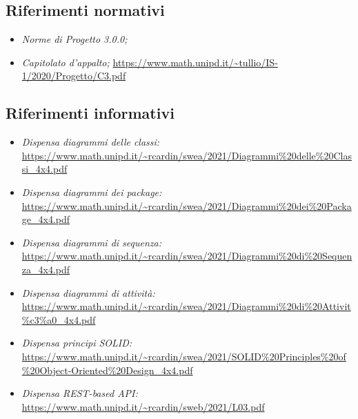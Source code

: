 \subsection{Riferimenti normativi}\label{IntroduzioneRiferimentiRiferimentiNormativi}
\begin{itemize}
	\item \textit{Norme di Progetto 3.0.0;}
	\item \textit{Capitolato d'appalto;}
	\url{https://www.math.unipd.it/~tullio/IS-1/2020/Progetto/C3.pdf}
\end{itemize}
\subsection{Riferimenti informativi}\label{IntroduzioneRiferimentiRiferimentiInformativi}
\begin{itemize}
	\item \textit{Dispensa diagrammi delle classi:}\\
	\url{https://www.math.unipd.it/~rcardin/swea/2021/Diagrammi\%20delle\%20Classi_4x4.pdf}
	\item \textit{Dispensa diagrammi dei package:}\\
	\url{https://www.math.unipd.it/~rcardin/swea/2021/Diagrammi\%20dei\%20Package_4x4.pdf}
	\item \textit{Dispensa diagrammi di sequenza:}\\
	\url{https://www.math.unipd.it/~rcardin/swea/2021/Diagrammi\%20di\%20Sequenza_4x4.pdf}
	\item \textit{Dispensa diagrammi di attività:}\\
	\url{https://www.math.unipd.it/~rcardin/swea/2021/Diagrammi\%20di\%20Attivit\%c3\%a0_4x4.pdf}
	\item \textit{Dispensa principi SOLID:}\\
	\url{https://www.math.unipd.it/~rcardin/swea/2021/SOLID\%20Principles\%20of\%20Object-Oriented\%20Design_4x4.pdf}
	\item \textit{Dispensa REST-based API:}\\
	\url{https://www.math.unipd.it/~rcardin/sweb/2021/L03.pdf}	
\end{itemize}